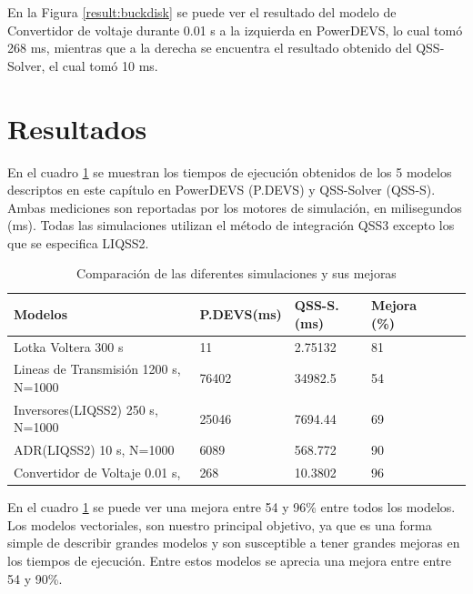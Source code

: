 En la Figura \ref{result:buckdisk} se puede ver el resultado del modelo de Convertidor de voltaje durante 0.01 s a la izquierda en PowerDEVS, lo cual tomó 268 ms, 
mientras que a la derecha se encuentra el resultado obtenido del QSS-Solver, el cual tomó 10 ms.

\section{Resultados}

	En el cuadro \ref{tab:result} se muestran los tiempos de ejecución obtenidos de los 5 modelos descriptos en este capítulo en  
	PowerDEVS (P.DEVS) y QSS-Solver (QSS-S). Ambas mediciones son reportadas por los motores de simulación, en milisegundos (ms).
	Todas las simulaciones utilizan el método de integración QSS3 excepto los que se especifica LIQSS2.

\begin{table}[H]
\centering	
\begin{tabular}{llllll}
\toprule
{\bf Modelos}            &  {\bf P.DEVS(ms)} & {\bf QSS-S. (ms)} & {\bf Mejora (\%)} \\
\toprule
Lotka  Voltera 300 s      		& 11            & 2.75132         & 81 \\
Lineas de Transmisión 1200 s, N=1000     & 76402         & 34982.5         & 54          \\
Inversores(LIQSS2) 250 s, N=1000   	& 25046         & 7694.44         & 69        \\
ADR(LIQSS2) 10 s, N=1000 		& 6089          & 568.772         & 90        \\
Convertidor de Voltaje 0.01 s,        	& 268           & 10.3802         & 96         

\end{tabular}
\caption{Comparación de las diferentes simulaciones y sus mejoras}\label{tab:result}
\end{table}

	En el cuadro \ref{tab:result} se puede ver una mejora entre 54 y 96\% entre todos los modelos.
	Los modelos vectoriales, son nuestro principal objetivo, ya que es una forma simple de describir grandes modelos y son susceptible a tener grandes mejoras
	en los tiempos de ejecución. Entre estos modelos se aprecia una mejora entre entre 54 y 90\%.
